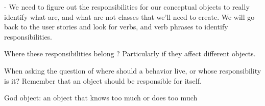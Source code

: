 - We need to figure out the responsibilities for our conceptual objects to really identify what are, and what are not classes that we'll need to create.
We will go back to the user stories and  look for verbs, and verb phrases to identify responsibilities.

Where these responsibilities belong ? Particularly if they affect different objects. 

When asking the question of where should a behavior live, or whose responsibility is it?
Remember that an object should be responsible for itself. 

God object:
  an object that knows too much or does too much